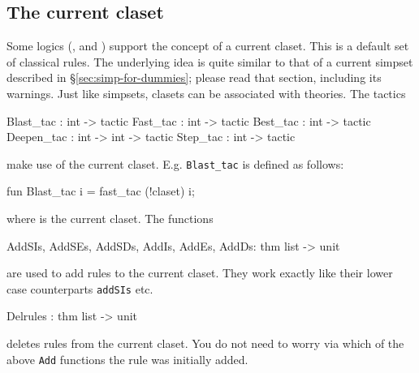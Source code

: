 \subsection{The current claset}
Some logics (\FOL, {\HOL} and \ZF) support the concept of a current
claset.  This is a default set of classical rules.  The
underlying idea is quite similar to that of a current simpset described in
\S\ref{sec:simp-for-dummies}; please read that section, including its
warnings.  Just like simpsets, clasets can be associated with theories.  The
tactics
\begin{ttbox}
Blast_tac     : int -> tactic
Fast_tac     : int -> tactic
Best_tac     : int -> tactic
Deepen_tac   : int -> int -> tactic
Step_tac     : int -> tactic
\end{ttbox}
%
make use of the current claset. E.g. {\tt Blast_tac} is defined as follows:
\begin{ttbox}
fun Blast_tac i = fast_tac (!claset) i;
\end{ttbox}
where  is the current claset.
The functions
\begin{ttbox}
AddSIs, AddSEs, AddSDs, AddIs, AddEs, AddDs: thm list -> unit
\end{ttbox}
  
  
are used to add rules to the current claset. They work exactly like their
lower case counterparts {\tt addSIs} etc.
\begin{ttbox}
Delrules : thm list -> unit
\end{ttbox}
deletes rules from the current claset. You do not need to worry via which of
the above {\tt Add} functions the rule was initially added.

